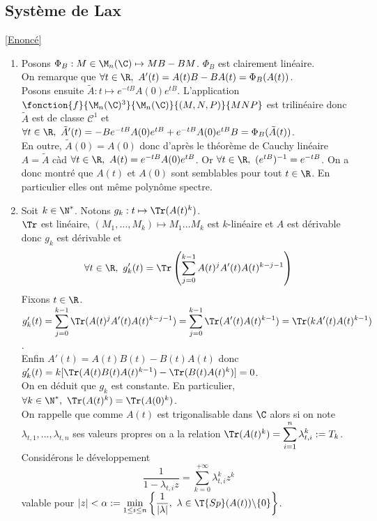 \documentclass{book}
\begin{document}
	\subsection{Système de Lax }
	\label{Système de Lax corrigé}
	\textcolor{blue}{\hyperref[Système de Lax]{[Enoncé]}}\\
	\begin{enumerate}[leftmargin=*]
		\item Posons $\Phi_B:M\in \M_n(\C)\mapsto MB-
		BM$. $\Phi_B$ est clairement linéaire.\\
		On remarque que $\forall t\in \R,\ A'(t)=A(t)B-BA(t)=\Phi_B(A(t))$.\\
		Posons ensuite $\tilde A:t\mapsto e^{-tB}A(0)e^{tB}$. L'application $\fonction{f}{\M_n(\C)^3}{\M_n(\C)}{(M,N,P)}{MNP}$ est trilinéaire donc $\tilde A$ est de classe $\mathcal C^1$ et $\forall t\in \R,\ \tilde A'(t)=-Be^{-tB}A(0)e^{tB}+e^{-tB}A(0)e^{tB}B=\Phi_B(\tilde A(t))$.\\
		En outre, $\tilde A(0)=A(0)$ donc d'après le théorème de Cauchy linéaire $A=\tilde A$ càd $\forall t\in \R,\ A(t)=e^{-tB}A(0)e^{tB}$. Or $\forall t\in \R,\ (e^{tB})^{-1}=e^{-tB}$. On a donc montré que $A(t)$ et $A(0)$ sont semblables pour tout $t\in \R$. En particulier elles ont même polynôme spectre.
		\item Soit $k\in \N^*$. Notons $g_k:t\mapsto \Tr(A(t)^k)$.\\
		$\Tr$ est linéaire, $(M_1,\dots,M_k)\mapsto M_1\dots M_k$ est $k$-linéaire et $A$ est dérivable donc $g_k$ est dérivable et
		$$\forall t\in \R,\ g_k'(t)=\Tr\left(\sum_{j=0}^{k-1}A(t)^jA'(t)A(t)^{k-j-1}\right)$$
		Fixons $t\in \R$.\\
		$g_k'(t)=\displaystyle\sum_{j=0}^{k-1}\Tr(A(t)^jA'(t)A(t)^{k-j-1})=\sum_{j=0}^{k-1}\Tr(A'(t)A(t)^{k-1})=\Tr(kA'(t)A(t)^{k-1})$.\\
		Enfin $A'(t)=A(t)B(t)-B(t)A(t)$ donc $g_k'(t)=k[\Tr(A(t)B(t)A(t)^{k-1})-\Tr(B(t)A(t)^k)]=0$.\\
		On en déduit que $g_k$ est constante. En particulier, $\forall k\in \N^*,\ \Tr(A(t)^k)=\Tr(A(0)^k)$.\\
		On rappelle que comme $A(t)$ est trigonalisable dans $\C$ alors si on note $\lambda_{t,1},\dots,\lambda_{t,n}$ ses valeurs propres on a la relation $\Tr(A(t)^k)=\displaystyle\sum_{i=1}^n\lambda_{t,i}^k:=T_k$.\\
		Considérons le développement $$\frac{1}{1-\lambda_{t,i}z}=\sum_{k=0}^{+\infty}\lambda_{t,i}^kz^k$$
		valable pour $|z|<\alpha:=\min\limits_{1\leq i\leq n}\left\{\dfrac{1}{|\lambda|},\ \lambda\in \T{Sp}(A(t))\backslash\{0\}\right\}$.\\

\end{enumerate}
\end{document}
